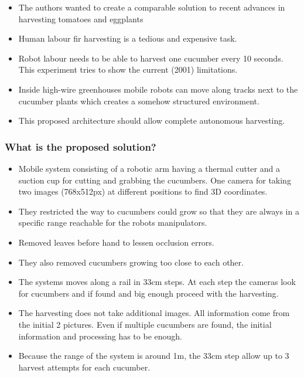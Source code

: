     \begin{itemize}
        \item The authors wanted to create a comparable solution to recent advances in harvesting tomatoes and eggplants
        \item Human labour fir harvesting is a tedious and expensive task.
        \item Robot labour needs to be able to harvest one cucumber every 10 seconds. This experiment tries to show the current (2001) limitations.
        \item Inside high-wire greenhouses mobile robots can move along tracks next to the cucumber plants which creates a somehow structured environment.
        \item This proposed architecture should allow complete autonomous harvesting.
    \end{itemize}
    \subsubsection*{What is the proposed solution?}
    \begin{itemize}
        \item Mobile system consisting of a robotic arm having a thermal cutter and a suction cup for cutting and grabbing the cucumbers. One camera for taking two
        images (768x512px) at different positions to find 3D coordinates.
        \item They restricted the way to cucumbers could grow so that they are always in a specific range reachable for the robots manipulators.
        \item Removed leaves before hand to lessen occlusion errors.
        \item They also removed cucumbers growing too close to each other.
        \item The systems moves along a rail in 33cm steps. At each step the cameras look for cucumbers and if found and big enough proceed with the harvesting.
        \item The harvesting does not take additional images. All information come from the initial 2 pictures. Even if multiple cucumbers are found, the initial information and processing has to be enough.
        \item Because the range of the system is around 1m, the 33cm step allow up to 3 harvest attempts for each cucumber.
    \end{itemize}
